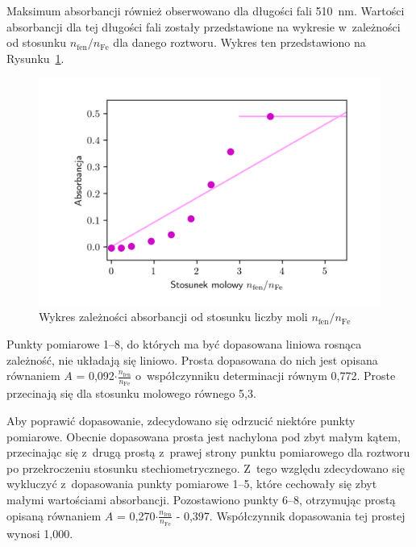 \documentclass[12pt]{article}
\begin{document}
\noindent Maksimum absorbancji również obserwowano dla długości fali 510~nm. Wartości absorbancji dla tej długości fali zostały przedstawione na wykresie w~zależności od stosunku $n_{\mathrm{fen}}/n_{\mathrm{Fe}}$ dla danego roztworu. Wykres ten przedstawiono na Rysunku~\ref{AnAnB}.

\begin{figure}[H]
    \begin{center}
        \includegraphics{ChFizLab_R3_A(nAnB).png}
    \end{center}
    \caption{Wykres zależności absorbancji od stosunku liczby moli $n_{\mathrm{fen}}/n_{\mathrm{Fe}}$}
    \label{AnAnB}
\end{figure}


Punkty pomiarowe 1--8, do których ma być dopasowana liniowa rosnąca zależność, nie układają się liniowo. Prosta dopasowana do nich jest opisana równaniem $A$ = 0,092$\cdot \frac{n_{\mathrm{fen}}}{n_{\mathrm{Fe}}}$ o~współczynniku determinacji równym 0,772. Proste przecinają się dla stosunku molowego równego 5,3.

Aby poprawić dopasowanie, zdecydowano się odrzucić niektóre punkty pomiarowe. Obecnie dopasowana prosta jest nachylona pod zbyt małym kątem, przecinając się z~drugą prostą z~prawej strony punktu pomiarowego dla roztworu po przekroczeniu stosunku stechiometrycznego. Z~tego względu zdecydowano się wykluczyć z~dopasowania punkty pomiarowe 1--5, które cechowały się zbyt małymi wartościami absorbancji. Pozostawiono punkty 6--8, otrzymując prostą opisaną równaniem $A$ = 0,270$\cdot \frac{n_{\mathrm{fen}}}{n_{\mathrm{Fe}}}$ - 0,397. Współczynnik dopasowania tej prostej wynosi 1,000.
\end{document}
